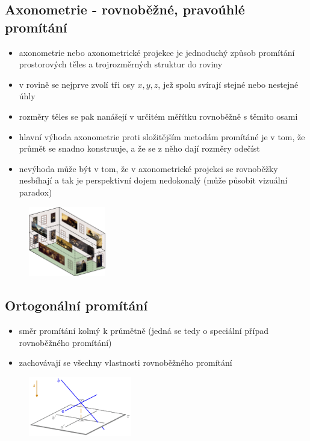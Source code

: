 \subsection{Axonometrie - rovnoběžné, pravoúhlé promítání}
\begin{itemize}
	\item axonometrie nebo axonometrické projekce je jednoduchý způsob promítání prostorových těles a trojrozměrných struktur do roviny
	\item v rovině se nejprve zvolí tři osy $x, y, z$, jež spolu svírají stejné nebo nestejné úhly
	\item rozměry těles se pak nanášejí v určitém měřítku rovnoběžně s těmito osami
	\item hlavní výhoda axonometrie proti složitějším metodám promítáné je v tom, že průmět se snadno konstruuje, a že se z něho dají rozměry odečíst
	\item nevýhoda může být v tom, že v axonometrické projekci se rovnoběžky nesbíhají a tak je perspektivní dojem nedokonalý (může působit vizuální paradox)
\end{itemize}

\begin{figure}[H]
\centering
\includegraphics[width=0.3\textwidth]{assets/2_axonometrie}
\end{figure}

\subsection{Ortogonální promítání}
\begin{itemize}
	\item směr promítání kolmý k průmětně (jedná se tedy o speciální případ rovnoběžného promítání)
	\item zachovávají se všechny vlastnosti rovnoběžného promítání
\end{itemize}
\begin{figure}[H]
\centering
\includegraphics[width=0.4\textwidth]{assets/2_ortogonalni}
\end{figure}
